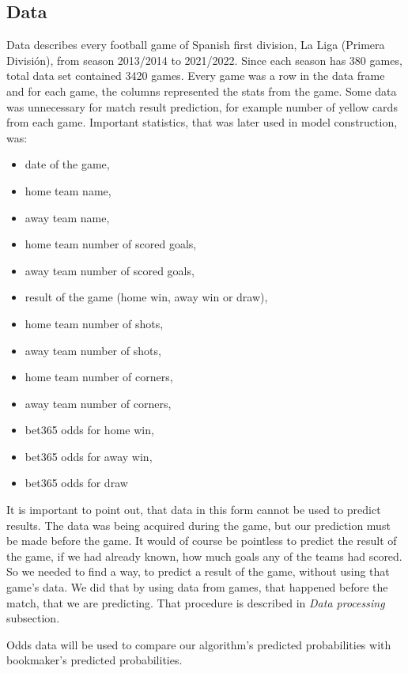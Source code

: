 \documentclass[conference]{IEEEtran}
\begin{document}
\subsection{Data}

Data describes every
football game of Spanish first division, La Liga (Primera División), from season 2013/2014 to 2021/2022. Since each season has 
380 games, total data set contained 3420 games. Every game was a row in the data frame and for each game, the columns represented 
the stats from the game. Some data was unnecessary for match result prediction, for example number of yellow cards from each game.
Important statistics, that was later used in model construction, was:
\begin{itemize}
    \item date of the game,
    \item home team name,
    \item away team name,
    \item home team number of scored goals,
    \item away team number of scored goals,
    \item result of the game (home win, away win or draw),
    \item home team number of shots,
    \item away team number of shots,
    \item home team number of corners,
    \item away team number of corners,
    \item bet365 odds for home win,
    \item bet365 odds for away win,
    \item bet365 odds for draw
\end{itemize}

It is important to point out, that data in this form cannot be used to predict results. The data was being acquired during the game,
but our prediction must be made before the game. It would of course be pointless to predict the result of the game, if we had 
already known, how much goals any of the teams had scored. So we needed to find a way, to predict a result of the game, 
without using that game's data. We did that by using data from games, that happened before the match, that we are predicting. 
That procedure is described in \emph{Data processing} subsection.

Odds data will be used to compare our algorithm's predicted probabilities with bookmaker's predicted probabilities.
\end{document}
